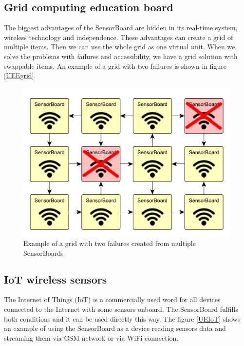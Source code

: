 \subsection{Grid computing education board}
\label{ExampleGrid}
The biggest advantages of the SensorBoard are hidden in its real-time system, wireless technology and independence. These advantages can create a grid of multiple items. Then we can use the whole grid as one virtual unit. When we solve the problems with failures and accessibility, we have a grid solution with swappable items. An example of a grid with two failures is shown in figure \ref{UEEgrid}.

\begin{figure}
	\centering
	\label{UEgrid}
	\caption{Example of a grid with two failures created from multiple SensorBoards}
	\includegraphics[width=\linewidth]{img/UsageExamplesGrid.pdf}
\end{figure}

\subsection{\ac{IoT} wireless sensors}
The Internet of Things (\ac{IoT}) is a commercially used word for all devices connected to the Internet with some sensors onboard. The SensorBoard fulfills both conditions and it can be used directly this way. The figure \ref{UEIoT} shows an example of using the SensorBoard as a device reading sensors data and streaming them via GSM network or via WiFi connection.

